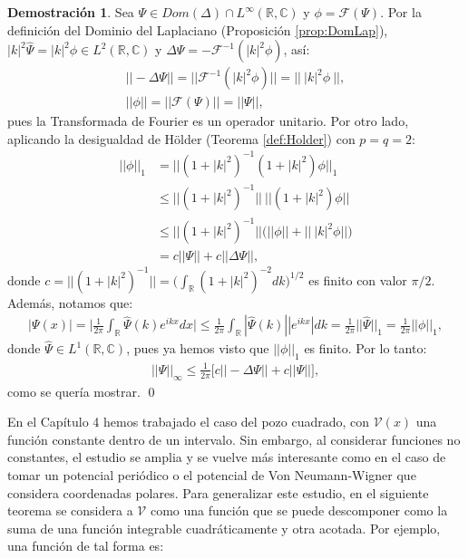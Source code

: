 \documentclass[12pt]{article}
\theoremstyle{definition}
\newtheorem*{demo}{Demostración}
\newcommand*{\field}[1]{\mathbb{#1}}
\begin{document}
\begin{demo}
    Sea $\Psi\in Dom(\Delta)\cap L^{\infty}(\field{R},\field{C})$ y $\phi = \mathcal{F}(\Psi)$. Por la definición del Dominio del Laplaciano (Proposición \ref{prop:DomLap}), $|k|^{2}\hat{\Psi} = |k|^{2} \phi \in L^{2}(\field{R},\field{C})$
    y $\Delta\Psi = -\mathcal{F}^{-1}(|k|^{2} \phi)$, así:
    \begin{align*} ||-\Delta\Psi|| = ||\mathcal{F}^{-1}(|k|^{2}\phi)|| = ||\: |k|^{2}\phi\:||,
    \\
     ||\phi|| = ||\mathcal{F}(\Psi)|| = ||\Psi||,
    \end{align*}
    pues la Transformada de Fourier es un operador unitario. Por otro lado, aplicando la desigualdad de Hölder (Teorema \ref{def:Holder}) con $p=q=2$:
    \begin{align*}
        ||\phi||_{1} & = ||(1+|k|^{2})^{-1}(1+|k|^{2})\phi||_{1}
        \\
        & \leq ||(1+|k|^{2})^{-1}||\:||(1+|k|^{2})\phi||
        \\
        &
        \leq ||(1+|k|^{2})^{-1}||\big(||\phi|| + ||\:|k|^2\phi||\big)
        \\
        &=c||\Psi|| + c ||\Delta\Psi||,
    \end{align*}
    donde $c =  ||(1+|k|^{2})^{-1}|| = \big(\int_{\field{R}}(1+|k|^{2})^{-2}dk\big)^{1/2}$ es finito con valor $\pi/2$. Además, notamos que:
    \begin{align*}
        |\Psi(x)| = \bigg|\frac{1}{2\pi}\int_{\field{R}}\hat{\Psi}(k)e^{ikx}dx\bigg| \leq
        \frac{1}{2\pi}\int_{\field{R}}|\hat{\Psi}(k)||e^{ikx}|dk = \frac{1}{2\pi}||\hat{\Psi}||_{1}=\frac{1}{2\pi}||\phi||_{1},
    \end{align*}
    donde $\hat{\Psi}\in L^1(\field{R},\field{C})$, pues ya hemos visto que $||\phi||_{1}$ es finito.
    Por lo tanto:
    \begin{align*}
        ||\Psi||_{\infty} \leq
        \frac{1}{2\pi}\big[c||-\Delta\Psi|| + c||\Psi||\big],
    \end{align*}
    como se quería mostrar.
    \qed
\end{demo}
\noindent
    En el Capítulo 4 hemos trabajado el caso del pozo cuadrado, con $\mathcal{V}(x)$ una función constante dentro de un intervalo. Sin embargo, al considerar funciones no constantes, el estudio se amplia y se vuelve más interesante como en el caso de tomar un potencial periódico o el potencial de Von Neumann-Wigner que considera coordenadas polares. Para generalizar este estudio, en el siguiente teorema se considera a $\mathcal{V}$ como una función que se puede descomponer como la suma de una función integrable cuadráticamente y otra acotada. Por ejemplo, una función de tal forma es:
\end{document}
